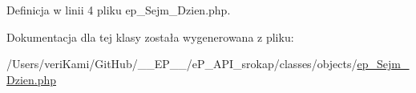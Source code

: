 Definicja w linii 4 pliku ep\-\_\-\-Sejm\-\_\-\-Dzien.\-php.



Dokumentacja dla tej klasy została wygenerowana z pliku\-:\begin{DoxyCompactItemize}
\item 
/\-Users/veri\-Kami/\-Git\-Hub/\-\_\-\-\_\-\-E\-P\-\_\-\-\_\-/e\-P\-\_\-\-A\-P\-I\-\_\-srokap/classes/objects/\hyperlink{ep___sejm___dzien_8php}{ep\-\_\-\-Sejm\-\_\-\-Dzien.\-php}\end{DoxyCompactItemize}

